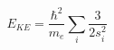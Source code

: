 \documentclass[12pt]{article}
\begin{document}
$$ 
E_{KE}  = \frac{\hbar^2 }{{m_{e} }}\sum\limits_i {\frac{3}{{2s_i^2 }}}
$$
\end{document}

